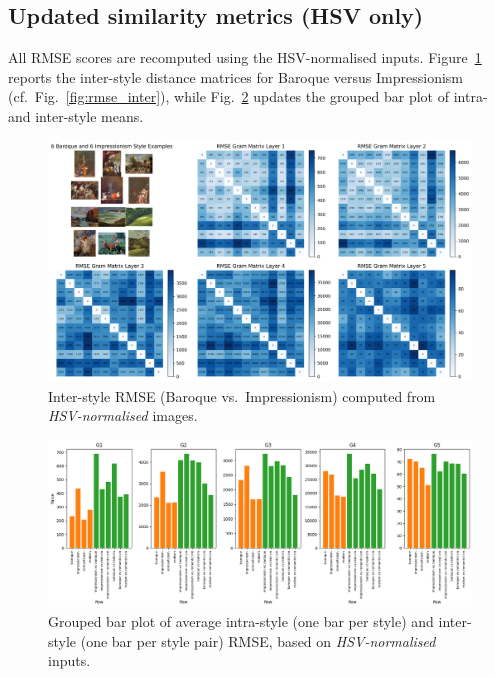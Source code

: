 \documentclass[a4paper,11pt]{article}
\begin{document}
\subsection{Updated similarity metrics (HSV only)}\label{sec:updated_metrics}
All RMSE scores are recomputed using the HSV-normalised inputs.
Figure~\ref{fig:rmse_inter_norm} reports the inter-style distance matrices for Baroque versus Impressionism (cf.\ Fig.~\ref{fig:rmse_inter}), while Fig.~\ref{fig:rmse_barplot_norm} updates the grouped bar plot of intra- and inter-style means.

\begin{figure}[htbp]
  \centering
  \includegraphics[width=\textwidth]{figures/rmse_norm_inter.png}
  \caption{Inter-style RMSE (Baroque vs.\ Impressionism) computed from \emph{HSV-normalised} images.}
  \label{fig:rmse_inter_norm}
\end{figure}

\begin{figure}[htbp]
  \centering
  \includegraphics[width=\textwidth]{figures/rmse_barplot_norm.png}
  \caption{Grouped bar plot of average intra-style (one bar per style) and inter-style (one bar per style pair) RMSE, based on \emph{HSV-normalised} inputs.}
  \label{fig:rmse_barplot_norm}
\end{figure}
\end{document}
